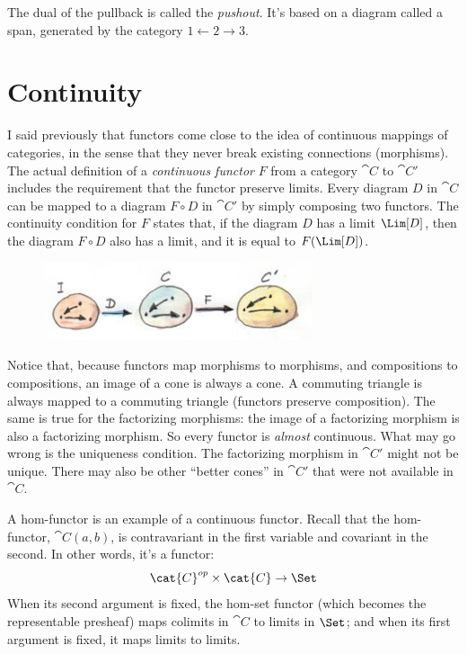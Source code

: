 The dual of the pullback is called the \emph{pushout}. It's based on a
diagram called a span, generated by the category
$1\leftarrow2\rightarrow3$.

\section{Continuity}

I said previously that functors come close to the idea of continuous
mappings of categories, in the sense that they never break existing
connections (morphisms). The actual definition of a \emph{continuous
functor} $F$ from a category $\cat{C}$ to $\cat{C'}$ includes the
requirement that the functor preserve limits. Every diagram $D$
in $\cat{C}$ can be mapped to a diagram $F \circ D$ in $\cat{C'}$ by
simply composing two functors. The continuity condition for $F$
states that, if the diagram $D$ has a limit $\Lim[D]$, then
the diagram $F \circ D$ also has a limit, and it is equal to
$F (\Lim[D])$.

\begin{figure}[H]
\centering
\includegraphics[width=3.12500in]{images/continuity.jpg}
\end{figure}

\noindent
Notice that, because functors map morphisms to morphisms, and
compositions to compositions, an image of a cone is always a cone. A
commuting triangle is always mapped to a commuting triangle (functors
preserve composition). The same is true for the factorizing morphisms:
the image of a factorizing morphism is also a factorizing morphism. So
every functor is \emph{almost} continuous. What may go wrong is the
uniqueness condition. The factorizing morphism in $\cat{C'}$ might not be
unique. There may also be other ``better cones'' in $\cat{C'}$ that were
not available in $\cat{C}$.

A hom-functor is an example of a continuous functor. Recall that the
hom-functor, $\cat{C}(a, b)$, is contravariant in the first variable
and covariant in the second. In other words, it's a functor:
\[\cat{C}^{op} \times \cat{C} \to \Set\]
When its second argument is fixed, the hom-set functor (which becomes
the representable presheaf) maps colimits in $\cat{C}$ to limits in
$\Set$; and when its first argument is fixed, it maps limits to
limits.

